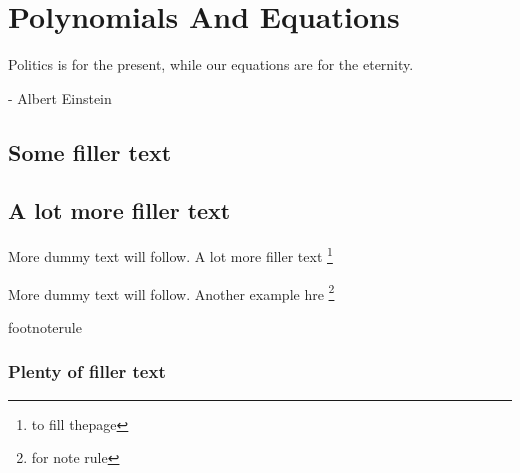 
\chapter[]{ Polynomials And Equations}
\epigraph{Politics is for the present, while our equations are for the eternity.}{- Albert Einstein}

\section[SectionName]{Some filler text}
\blindtext
\section[section name]{A lot more filler text}
More dummy text will follow. A lot more filler text \protect\footnote{to fill thepage}

More dummy text will follow. Another example hre \protect\footnote{for note rule}

footnoterule

\subsection[subsection name]{Plenty of filler text}
\blindtext[1]

